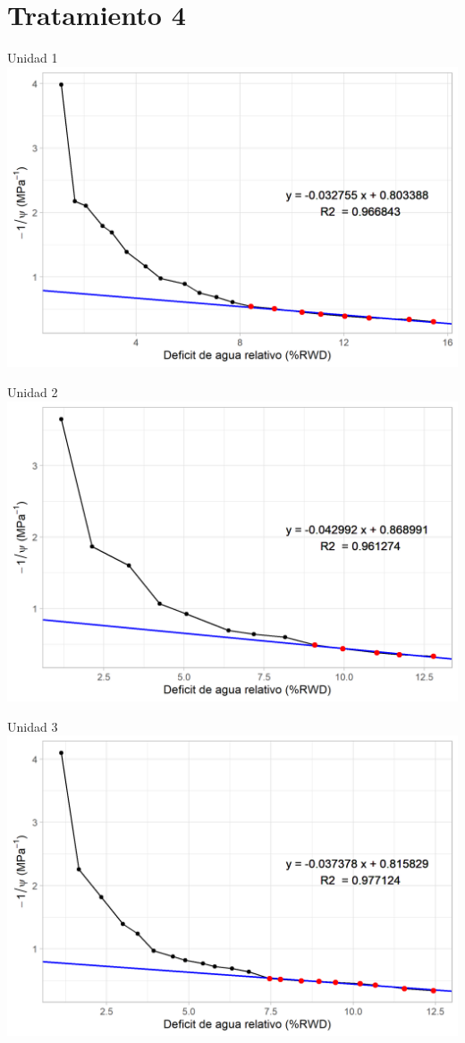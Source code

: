 \documentclass[
  letterpaper,
  DIV=11,
  numbers=noendperiod]{scrreprt}
\begin{document}
\chapter{Tratamiento 4}

Unidad 1 \includegraphics{figuras/06_tlp/tlp_rio_claro_T4_1.png}

Unidad 2 \includegraphics{figuras/06_tlp/tlp_rio_claro_T4_2.png}

Unidad 3 \includegraphics{figuras/06_tlp/tlp_rio_claro_T4_3.png}
\end{document}
